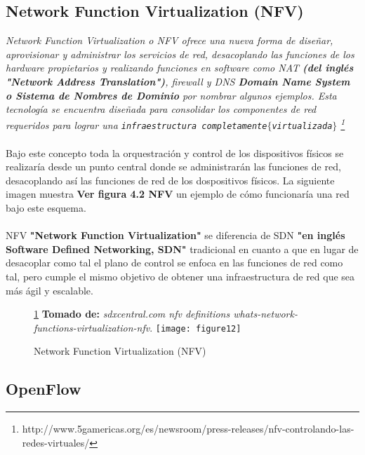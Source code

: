 \subsection{Network Function Virtualization (NFV)}

\textit{Network Function Virtualization o NFV ofrece una nueva forma de diseñar, aprovisionar y administrar los servicios de red, desacoplando las funciones de los hardware propietarios y realizando funciones en software como NAT \textbf{(del inglés "Network Address Translation")}, firewall y DNS \textbf{Domain Name System o Sistema de Nombres de Dominio} por nombrar algunos ejemplos. Esta tecnología se encuentra diseñada para consolidar los componentes de red requeridos para lograr una \texttt{infraestructura completamente$\{$virtualizada$\}$} \footnote{http://www.5gamericas.org/es/newsroom/press-releases/nfv-controlando-las-redes-virtuales/}}
\\
\\
Bajo este concepto toda la orquestración y control de los dispositivos físicos se realizaría desde un punto central donde se administrarán las funciones de red, desacoplando así las funciones de red de los dospositivos físicos. La siguiente imagen muestra \textbf{Ver figura 4.2 NFV} un ejemplo de cómo funcionaría una red bajo este esquema.
\\
\\
NFV \textbf{"Network Function Virtualization"} se diferencia de SDN \textbf{"en inglés Software Defined Networking, SDN"} tradicional en cuanto a que en lugar de desacoplar como tal el plano de control se enfoca en las funciones de red como tal, pero cumple el mismo objetivo de obtener una infraestructura de red que sea más ágil y escalable.
\begin{figure}[htbp]
 \ref{fig:nfv} \textbf{Tomado de:} \textit{sdxcentral.com nfv definitions whats-network-functions-virtualization-nfv}.
  \centering
    {\texttt{[image: figure12]}}%
  \caption{Network Function Virtualization (NFV)}
  \label{fig:nfv}
\end{figure}

\subsection{OpenFlow}
\label{sec:OpenFlow}

